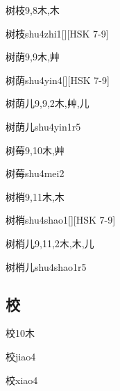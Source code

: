 \begin{Entry}{树枝}{9,8}{⽊,⽊}
  \begin{Phonetics}{树枝}{shu4zhi1}[][HSK 7-9]
  \end{Phonetics}
\end{Entry}

\begin{Entry}{树荫}{9,9}{⽊,⾋}
  \begin{Phonetics}{树荫}{shu4yin4}[][HSK 7-9]
  \end{Phonetics}
\end{Entry}

\begin{Entry}{树荫儿}{9,9,2}{⽊,⾋,⼉}
  \begin{Phonetics}{树荫儿}{shu4yin1r5}
  \end{Phonetics}
\end{Entry}

\begin{Entry}{树莓}{9,10}{⽊,⾋}
  \begin{Phonetics}{树莓}{shu4mei2}
  \end{Phonetics}
\end{Entry}

\begin{Entry}{树梢}{9,11}{⽊,⽊}
  \begin{Phonetics}{树梢}{shu4shao1}[][HSK 7-9]
  \end{Phonetics}
\end{Entry}

\begin{Entry}{树梢儿}{9,11,2}{⽊,⽊,⼉}
  \begin{Phonetics}{树梢儿}{shu4shao1r5}
  \end{Phonetics}
\end{Entry}

\subsection*{校}

\begin{Entry}{校}{10}{⽊}
  \begin{Phonetics}{校}{jiao4}
  \end{Phonetics}
  \begin{Phonetics}{校}{xiao4}
  \end{Phonetics}
\end{Entry}

